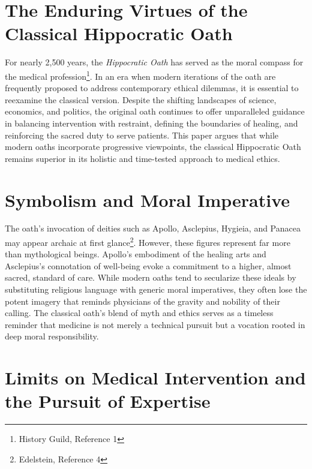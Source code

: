 \documentclass[12pt]{article}
\begin{document}
\bigskip

\section*{The Enduring Virtues of the Classical Hippocratic Oath}

For nearly 2,500 years, the \textit{Hippocratic Oath} has served as the moral compass for the medical profession\footnote{History Guild, Reference 1}. In an era when modern iterations of the oath are frequently proposed to address contemporary ethical dilemmas, it is essential to reexamine the classical version. Despite the shifting landscapes of science, economics, and politics, the original oath continues to offer unparalleled guidance in balancing intervention with restraint, defining the boundaries of healing, and reinforcing the sacred duty to serve patients. This paper argues that while modern oaths incorporate progressive viewpoints, the classical Hippocratic Oath remains superior in its holistic and time-tested approach to medical ethics.

\bigskip

\section*{Symbolism and Moral Imperative}

The oath’s invocation of deities such as Apollo, Asclepius, Hygieia, and Panacea may appear archaic at first glance\footnote{Edelstein, Reference 4}. However, these figures represent far more than mythological beings. Apollo’s embodiment of the healing arts and Asclepius’s connotation of well-being evoke a commitment to a higher, almost sacred, standard of care. While modern oaths tend to secularize these ideals by substituting religious language with generic moral imperatives, they often lose the potent imagery that reminds physicians of the gravity and nobility of their calling. The classical oath’s blend of myth and ethics serves as a timeless reminder that medicine is not merely a technical pursuit but a vocation rooted in deep moral responsibility.

\bigskip

\section*{Limits on Medical Intervention and the Pursuit of Expertise}
\end{document}
